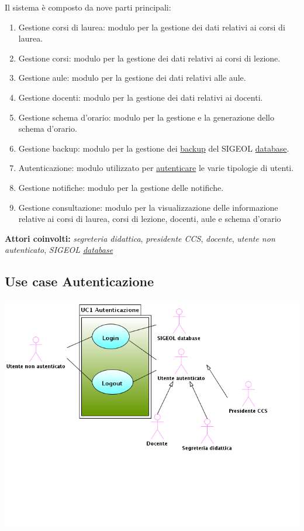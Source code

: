 \documentclass[11pt,a4paper]{article}
\begin{document}
Il sistema è composto da nove parti principali:
\begin{enumerate}
\item Gestione corsi di laurea: modulo per la gestione dei dati relativi ai corsi di laurea.
\item Gestione corsi: modulo per la gestione dei dati relativi ai corsi di lezione.
\item Gestione aule: modulo per la gestione dei dati relativi alle aule.
\item Gestione docenti: modulo per la gestione dei dati relativi ai docenti.
\item Gestione schema d'orario: modulo per la gestione e la generazione dello schema d'orario.
\item Gestione backup: modulo per la gestione dei \underline{backup} del SIGEOL \underline{database}.
\item Autenticazione: modulo utilizzato per \underline{autenticare} le varie tipologie di utenti.
\item Gestione notifiche: modulo per la gestione delle notifiche.
\item Gestione consultazione: modulo per la visualizzazione delle informazione relative ai corsi di laurea, corsi di lezione, docenti, aule e schema d'orario
\end{enumerate}
\textbf{Attori coinvolti:}
\textit{segreteria didattica}, \textit{presidente CCS}, \textit{docente}, \textit{utente non autenticato}, \textit{SIGEOL \underline{database}}
\subsection{Use case Autenticazione}
\begin{center} 
 \includegraphics[scale=0.5]{images/UseCaseAutenticazione.png}
\end{center}
\end{document}
